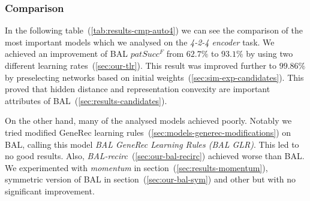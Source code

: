 
\subsubsection{Comparison} 
\label{sec:tlr-auto4-cmp} 

In the following table~(\ref{tab:results-cmp-auto4}) we can see the comparison of the most important models which we analysed on the \emph{4-2-4 encoder} task. We achieved an improvement of BAL $patSucc^F$ from $62.7\%$ to $93.1\%$ by using two different learning rates~(\ref{sec:our-tlr}). This result was improved further to $99.86\%$ by preselecting networks based on initial weights~(\ref{sec:sim-exp-candidates}). This proved that hidden distance and representation convexity are important attributes of BAL~(\ref{sec:results-candidates}). 

On the other hand, many of the analysed models achieved poorly. Notably we tried modified GeneRec learning rules~(\ref{sec:models-generec-modifications}) on BAL, calling this model \emph{BAL GeneRec Learning Rules (BAL GLR)}. This led to no good results. Also, \emph{BAL-recirc}~(\ref{sec:our-bal-recirc}) achieved worse than BAL. We experimented with \emph{momentum} in section~(\ref{sec:results-momentum}), symmetric version of BAL in section~(\ref{sec:our-bal-sym}) and other but with no significant improvement. 

